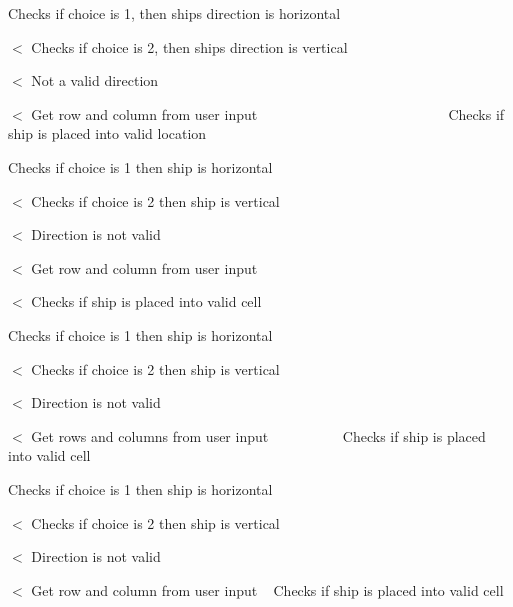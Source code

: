 Checks if choice is 1, then ship\textquotesingle{}s direction is horizontal

$<$ Checks if choice is 2, then ship\textquotesingle{}s direction is vertical

$<$ Not a valid direction

$<$ Get row and column from user input ~\newline
~\newline
~\newline
~\newline
~\newline
~\newline
~\newline
~\newline
~\newline
~\newline
~\newline
~\newline
~\newline
~\newline
~\newline
~\newline
 Checks if ship is placed into valid location

Checks if choice is 1 then ship is horizontal

$<$ Checks if choice is 2 then ship is vertical

$<$ Direction is not valid

$<$ Get row and column from user input

$<$ Checks if ship is placed into valid cell

Checks if choice is 1 then ship is horizontal

$<$ Checks if choice is 2 then ship is vertical

$<$ Direction is not valid

$<$ Get rows and columns from user input ~\newline
~\newline
~\newline
~\newline
~\newline
~\newline
 Checks if ship is placed into valid cell

Checks if choice is 1 then ship is horizontal

$<$ Checks if choice is 2 then ship is vertical

$<$ Direction is not valid

$<$ Get row and column from user input ~\newline
 Checks if ship is placed into valid cell 

